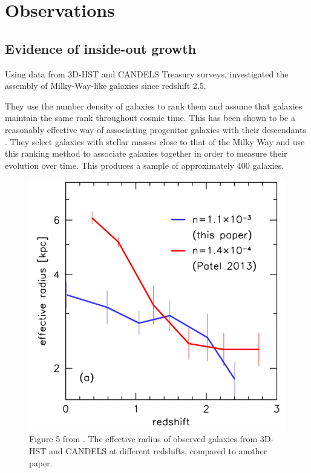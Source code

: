 \documentclass[preprint2]{aastex631}
\begin{document}
\section{Observations}
\subsection{Evidence of inside-out growth}
Using data from 3D-HST and CANDELS Treasury surveys, \citet{vanDokkum+2013} investigated the assembly of Milky-Way-like galaxies since redshift 2.5.

They use the number density of galaxies to rank them and assume that galaxies maintain the same rank throughout cosmic time. This has been shown to be a reasonably effective way of associating progenitor galaxies with their descendants \citep{Leja+2013}. They select galaxies with stellar masses close to that of the Milky Way and use this ranking method to associate galaxies together in order to measure their evolution over time. This produces a sample of approximately 400 galaxies.

\begin{figure}[htb]
    \centering
    \includegraphics[width=\columnwidth]{vandokkum2013_fig5.png}
    \caption{Figure 5 from \citet{vanDokkum+2013}. The effective radius of observed galaxies from 3D-HST and CANDELS at different redshifts, compared to another paper.}
    \label{fig:vd}
\end{figure}
\end{document}
